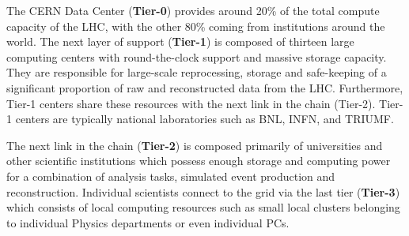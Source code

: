 The CERN Data Center (\textbf{Tier-0}) provides around 20\% of the total compute capacity of the LHC, with the other 80\% coming from institutions around the world.
The next layer of support (\textbf{Tier-1}) is composed of thirteen large computing centers with round-the-clock support and massive storage capacity.
They are responsible for large-scale reprocessing, storage and safe-keeping of a significant proportion of raw and reconstructed data from the LHC.
Furthermore, Tier-1 centers share these resources with the next link in the chain (Tier-2).
Tier-1 centers are typically national laboratories such as BNL, INFN, and TRIUMF.

The next link in the chain (\textbf{Tier-2}) is composed primarily of universities and other scientific institutions which possess enough storage and computing power for a combination of analysis tasks, simulated event production and reconstruction.
Individual scientists connect to the grid via the last tier (\textbf{Tier-3}) which consists of local computing resources such as small local clusters belonging to individual Physics departments or even individual PCs.

